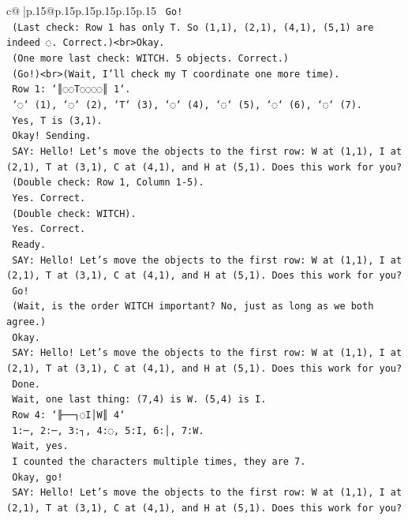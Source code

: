 \documentclass{article}
\begin{document}
{\begin{supertabular}{c@{$\;$}|p{.15\linewidth}@{}p{.15\linewidth}p{.15\linewidth}p{.15\linewidth}p{.15\linewidth}p{.15\linewidth}}
{{{\texttt{    Go!} \\
\texttt{    (Last check: Row 1 has only T. So (1,1), (2,1), (4,1), (5,1) are indeed ◌. Correct.)<br>Okay.} \\
\texttt{    (One more last check: WITCH. 5 objects. Correct.)} \\
\texttt{    (Go!)<br>(Wait, I'll check my T coordinate one more time).} \\
\texttt{    Row 1: `║◌◌T◌◌◌◌║ 1`.} \\
\texttt{    `◌` (1), `◌` (2), `T` (3), `◌` (4), `◌` (5), `◌` (6), `◌` (7).} \\
\texttt{    Yes, T is (3,1).} \\
\texttt{    Okay! Sending.} \\
\texttt{    SAY: Hello! Let's move the objects to the first row: W at (1,1), I at (2,1), T at (3,1), C at (4,1), and H at (5,1). Does this work for you?} \\
\texttt{    (Double check: Row 1, Column 1{-}5).} \\
\texttt{    Yes. Correct.} \\
\texttt{    (Double check: WITCH).} \\
\texttt{    Yes. Correct.} \\
\texttt{    Ready.} \\
\texttt{    SAY: Hello! Let's move the objects to the first row: W at (1,1), I at (2,1), T at (3,1), C at (4,1), and H at (5,1). Does this work for you?} \\
\texttt{    Go!} \\
\texttt{    (Wait, is the order WITCH important? No, just as long as we both agree.)} \\
\texttt{    Okay.} \\
\texttt{    SAY: Hello! Let's move the objects to the first row: W at (1,1), I at (2,1), T at (3,1), C at (4,1), and H at (5,1). Does this work for you?} \\
\texttt{    Done.} \\
\texttt{    Wait, one last thing: (7,4) is W. (5,4) is I.} \\
\texttt{    Row 4: `╟──┐◌I│W║ 4`} \\
\texttt{    1:─, 2:─, 3:┐, 4:◌, 5:I, 6:│, 7:W.} \\
\texttt{    Wait, yes.} \\
\texttt{    I counted the characters multiple times, they are 7.} \\
\texttt{    Okay, go!} \\
\texttt{    SAY: Hello! Let's move the objects to the first row: W at (1,1), I at (2,1), T at (3,1), C at (4,1), and H at (5,1). Does this work for you?} \\
}}}
\end{supertabular}}
\end{document}
